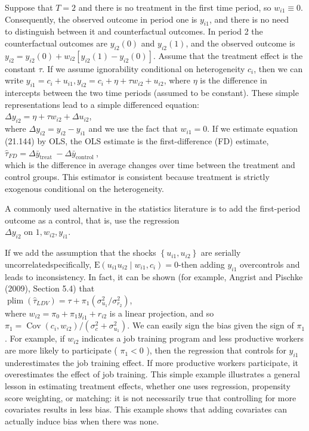 \documentclass[10pt]{article}
\begin{document}
Suppose that $T=2$ and there is no treatment in the first time period, so $w_{i 1} \equiv 0$. Consequently, the observed outcome in period one is $y_{i 1}$, and there is no need\\
to distinguish between it and counterfactual outcomes. In period 2 the counterfactual outcomes are $y_{i 2}(0)$ and $y_{i 2}(1)$, and the observed outcome is $y_{i 2}=y_{i 2}(0)+ w_{i 2}\left[y_{i 2}(1)-y_{i 2}(0)\right]$. Assume that the treatment effect is the constant $\tau$. If we assume ignorability conditional on heterogeneity $c_{i}$, then we can write $y_{i 1}=c_{i}+u_{i 1}, y_{i 2}= c_{i}+\eta+\tau w_{i 2}+u_{i 2}$, where $\eta$ is the difference in intercepts between the two time periods (assumed to be constant). These simple representations lead to a simple differenced equation:\\
$\Delta y_{i 2}=\eta+\tau w_{i 2}+\Delta u_{i 2}$,\\
where $\Delta y_{i 2}=y_{i 2}-y_{i 1}$ and we use the fact that $w_{i 1}=0$. If we estimate equation (21.144) by OLS, the OLS estimate is the first-difference (FD) estimate,\\
$\hat{\tau}_{F D}=\Delta \bar{y}_{\text {treat }}-\Delta \bar{y}_{\text {control }}$,\\
which is the difference in average changes over time between the treatment and control groups. This estimator is consistent because treatment is strictly exogenous conditional on the heterogeneity.

A commonly used alternative in the statistics literature is to add the first-period outcome as a control, that is, use the regression\\
$\Delta y_{i 2}$ on $1, w_{i 2}, y_{i 1}$.

If we add the assumption that the shocks $\left\{u_{i 1}, u_{i 2}\right\}$ are serially uncorrelatedspecifically, $\mathrm{E}\left(u_{i 1} u_{i 2} \mid w_{i 1}, c_{i}\right)=0$-then adding $y_{i 1}$ overcontrols and leads to inconsistency. In fact, it can be shown (for example, Angrist and Pischke (2009), Section 5.4) that\\
$\operatorname{plim}\left(\hat{\tau}_{L D V}\right)=\tau+\pi_{1}\left(\sigma_{u_{1}}^{2} / \sigma_{r_{2}}^{2}\right)$,\\
where $w_{i 2}=\pi_{0}+\pi_{1} y_{i 1}+r_{i 2}$ is a linear projection, and so $\pi_{1}=\operatorname{Cov}\left(c_{i}, w_{i 2}\right) / \left(\sigma_{c}^{2}+\sigma_{u_{1}}^{2}\right)$. We can easily sign the bias given the sign of $\pi_{1}$. For example, if $w_{i 2}$ indicates a job training program and less productive workers are more likely to participate ( $\pi_{1}<0$ ), then the regression that controls for $y_{i 1}$ underestimates the job training effect. If more productive workers participate, it overestimates the effect of job training. This simple example illustrates a general lesson in estimating treatment effects, whether one uses regression, propensity score weighting, or matching: it is not necessarily true that controlling for more covariates results in less bias. This example shows that adding covariates can actually induce bias when there was none.
\end{document}
